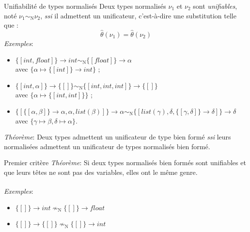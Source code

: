 \documentclass[serif]{beamer}
\newcommand{\exemples}{\textit{Exemples}\xspace}
\newcommand{\theoreme}{\textit{Théorème}\xspace}
\newcommand{\mset}[1]{\{\![#1]\!\}}
\newcommand{\ssi}{\textit{ssi}\xspace}
\newcommand{\N}{\mathrm{N}}
\begin{document}
\begin{frame}{Unifiabilité de types normalisés}
\footnotesize
Deux types normalisés $\nu_1$ et $\nu_2$ sont \emph{unifiables}, noté $\nu_1 \sim_\N \nu_2$, \ssi il admettent un unificateur, c'est-à-dire une substitution telle que :
\[ \hat\theta (\nu_1) = \hat\theta (\nu_2) \]
\exemples :
\begin{itemize}
  \item $\mset{int, float} \rightarrow int \sim_\N \mset{float} \rightarrow \alpha$ \\ avec $\{ \alpha \mapsto \mset{int} \rightarrow int \}$ ;
  \item $\mset{int, \alpha} \rightarrow \mset{} \sim_\N \mset{int, int, int} \rightarrow \mset{}$ \\ avec $\{ \alpha \mapsto \mset{int, int} \}$ ;
  \item $\mset{\mset{\alpha, \beta} \rightarrow \alpha, \alpha, list (\beta)} \rightarrow \alpha \sim_\N \mset{list (\gamma), \delta, \mset{\gamma, \delta} \rightarrow \delta} \rightarrow \delta$ \\ avec $\{ \gamma \mapsto \beta, \delta \mapsto \alpha \}$.
\end{itemize}
\bigskip
\theoreme : Deux types admettent un unificateur de type bien formé \ssi leurs normalisées admettent un unificateur de types normalisés bien formé.
\end{frame}


\begin{frame}{Premier critère}
\small
\theoreme : Si deux types normalisés bien formés sont unifiables et que leurs têtes ne sont pas des variables, elles ont le même genre.
\\~\\
\exemples :
\begin{itemize}
  \item $\mset{} \rightarrow int \nsim_\N \mset{} \rightarrow float$
  \item $\mset{} \rightarrow \mset{} \nsim_\N \mset{} \rightarrow int$
\end{itemize}
\end{frame}

\end{document}
